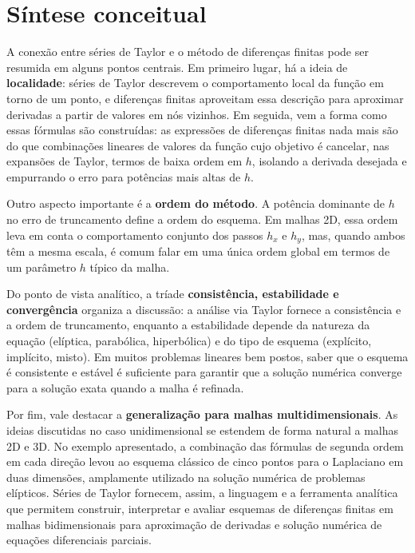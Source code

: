 \section{Síntese conceitual}

A conexão entre séries de Taylor e o método de diferenças finitas pode ser 
resumida em alguns pontos centrais. Em primeiro lugar, há a ideia de 
\textbf{localidade}: séries de Taylor descrevem o comportamento local da 
função em torno de um ponto, e diferenças finitas aproveitam essa descrição 
para aproximar derivadas a partir de valores em nós vizinhos. Em seguida, 
vem a forma como essas fórmulas são construídas: as expressões de diferenças 
finitas nada mais são do que combinações lineares de valores da função 
cujo objetivo é cancelar, nas expansões de Taylor, termos de baixa ordem em 
$h$, isolando a derivada desejada e empurrando o erro para potências mais 
altas de $h$.

Outro aspecto importante é a \textbf{ordem do método}. A potência dominante 
de $h$ no erro de truncamento define a ordem do esquema. Em malhas 2D, essa 
ordem leva em conta o comportamento conjunto dos passos $h_x$ e $h_y$, mas, 
quando ambos têm a mesma escala, é comum falar em uma única ordem global em 
termos de um parâmetro $h$ típico da malha.

Do ponto de vista analítico, a tríade \textbf{consistência, estabilidade e 
convergência} organiza a discussão: a análise via Taylor fornece a 
consistência e a ordem de truncamento, enquanto a estabilidade depende da 
natureza da equação (elíptica, parabólica, hiperbólica) e do tipo de 
esquema (explícito, implícito, misto). Em muitos problemas lineares bem 
postos, saber que o esquema é consistente e estável é suficiente para 
garantir que a solução numérica converge para a solução exata quando a malha 
é refinada.

Por fim, vale destacar a \textbf{generalização para malhas multidimensionais}. 
As ideias discutidas no caso unidimensional se estendem de forma natural a 
malhas 2D e 3D. No exemplo apresentado, a combinação das fórmulas de segunda 
ordem em cada direção levou ao esquema clássico de cinco pontos para o 
Laplaciano em duas dimensões, amplamente utilizado na solução numérica de 
problemas elípticos. Séries de Taylor fornecem, assim, a linguagem e a 
ferramenta analítica que permitem construir, interpretar e avaliar esquemas 
de diferenças finitas em malhas bidimensionais para aproximação de derivadas 
e solução numérica de equações diferenciais parciais.